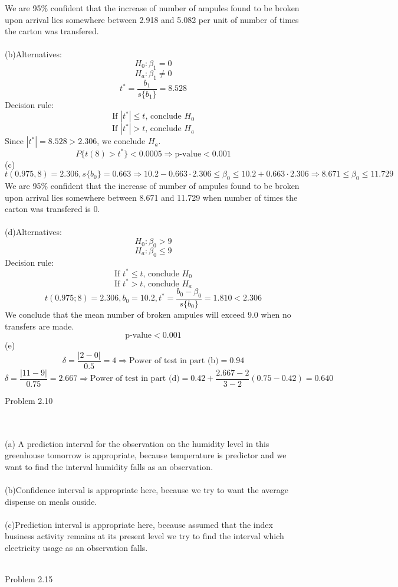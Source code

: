 \documentclass{article}
\begin{document}
We are 95\% confident that the increase of number of ampules found to be broken upon arrival lies somewhere between 2.918 and 5.082 per unit of number of times the carton was transfered.
\\\\(b)Alternatives:\[H_0:\beta_1=0\]
\[H_a:\beta_1\neq0\]
\[t^*=\frac{b_1}{s\{b_1\}}=8.528\]
Decision rule:\[\text{If $|t^*|\leq t$, conclude $H_0$}\]
\[\text{If $|t^*|> t$, conclude $H_a$}\]
Since $|t^*|=8.528>2.306$, we conclude $H_a$.
\[P\{t(8) > t^*\}< 0.0005\Rightarrow \text{p-value}<0.001 \]
(c)\[t(0.975,8)=2.306,s\{b_0\}=0.663\Rightarrow10.2-0.663\cdot2.306\leq\beta_0\leq10.2+0.663\cdot2.306\Rightarrow8.671\leq\beta_0\leq11.729\]
We are 95\% confident that the increase of number of ampules found to be broken upon arrival lies somewhere between 8.671 and 11.729 when number of times the carton was transfered is 0.
\\\\(d)Alternatives:\[H_0:\beta_0>9\]
\[H_a:\beta_0\leq9\]
Decision rule:\[\text{If $t^*\leq t$, conclude $H_0$}\]
\[\text{If $t^*> t$, conclude $H_a$}\]
\[t(0.975;8)=2.306,b_0=10.2,t^*=\frac{b_0-\beta_0}{s\{b_0\}}=1.810<2.306\]
We conclude that the mean number of broken ampules will exceed 9.0 when no transfers are made.
\[\text{p-value}<0.001\]
(e)\[\delta=\frac{|2-0|}{0.5}=4\Rightarrow \text{Power of test in part (b)}=0.94\]
\[\delta=\frac{|11-9|}{0.75}=2.667\Rightarrow \text{Power of test in part (d)}=0.42+\frac{2.667-2}{3-2}(0.75-0.42)=0.640\]
\begin{large}Problem 2.10\end{large}
\\\\(a) A prediction interval for the observation on the humidity level in this greenhouse tomorrow is appropriate, because temperature is predictor and we want to find the interval humidity falls as an observation.
\\\\(b)Confidence interval is appropriate here, because we try to want the average dispense on meals ouside.
\\\\(c)Prediction interval is appropriate here, because assumed that the index business activity remains at its present level we try to find the interval which electricity usage as an observation falls.
\\\\\begin{large}Problem 2.15\end{large}
\end{document}
